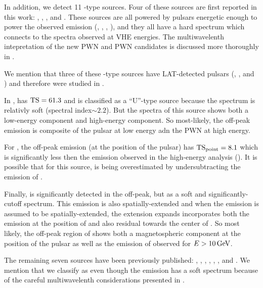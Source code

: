 In addition, we detect 11 \PWNcClass-type sources.  Four of these sources
are first reported in this work: , , ,
and .  These sources are all powered by pulsars energetic
enough to power the observed emission (, ,
, ), and they all have a hard spectrum which
connects to the spectra observed at \ac{VHE} energies.  The multiwavelenth
intepretation of the new \ac{PWN} and \ac{PWN} candidates is discussed
more thoroughly in \cite{acero_2013a_constraints-galactic}.


We mention that three of these \PWNcClass-type sources have LAT-detected
pulsars (, , and ) and therefore were
studied in .

In ,  has $\mathrm{TS}=61.3$ and is classified as
a ``U''-type source because the spectrum is relativly soft (spectral
index$\sim2.2$).  But the spectra of this source shows both a low-energy
component and high-energy component.  So most-likely, the off-peak
emission is composite of the pulsar at low energy adn the \ac{PWN}
at high energy.

For , the off-peak emission (at the position of the pulsar)
has $\mathrm{TS}_\mathrm{point}=8.1$ which is significantly less then the emission observed
in the high-energy analysis ().  It is possible that for this
source, \tstev is being overestimated by undersubtracting the emission
of .

Finally,  is significantly detected in the off-peak,
but as a soft and significantly-cutoff spectrum. This emission
is also spatially-extended and when the emission is assumed to be
spatially-extended, the extension expands incorporates both the emission
at the position of  and also residual towards the center of
. So most likely, the off-peak region of  shows
both a magnetospheric component at the position of the pulsar as well
as the emission of  observed for $E>10\,\text{GeV}$.

The remaining seven sources have been previously published:
 \citep{ackermann_2011a_fermi-lat-search},
 \citep{slane_2010a_fermi-detection}, 
\citep{lande_2012_search-spatially}, 
\citep{lande_2012_search-spatially}, 
\citep{lande_2012_search-spatially}, 
\citep{tam_2010a_search-counterparts}, and 
\citep{rousseau_2012a_fermi-lat-constraints}.  We mention that we
classify  as \PWNcClass even though the \gev emission has
a soft spectrum because of the careful multiwavelenth considerations
presented in \cite{lemoine-goumard_2011a_fermi-lat-detection}.

